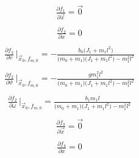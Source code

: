 \documentclass[11pt,a4paper,oneside]{book}
\numberwithin{equation}{section}
\theoremstyle{it}
\theoremstyle{definition}
\begin{document}
\begin{equation}\label{pendulum_on_cart_14}
	\begin{aligned}
		\frac{\partial f_1}{\partial \vec{x}}=\vec{0}\\[6pt]
	\end{aligned}
\end{equation}
\begin{equation}\label{pendulum_on_cart_15}
	\begin{aligned}
		\frac{\partial f_2}{\partial x}=0\\[6pt]
	\end{aligned}
\end{equation}
\begin{equation}\label{pendulum_on_cart_16}
	\begin{aligned}
		\frac{\partial f_2}{\partial v}\,\Big|_{\vec{x}_0,f_{m,0}}=-\frac{b_0\big(J_1+m_1l^2\big)}{\big(m_0+m_1\big)\big(J_1+m_1l^2\big)-m_1^2l^2}\\[6pt]
	\end{aligned}
\end{equation}
\begin{equation}\label{pendulum_on_cart_17}
	\begin{aligned}
		\frac{\partial f_2}{\partial \vartheta}\,\Big|_{\vec{x}_0,f_{m,0}}=-\frac{gm_1^2l^2}{\big(m_0+m_1\big)\big(J_1+m_1l^2\big)-m_1^2l^2}\\[6pt]
	\end{aligned}
\end{equation}
\begin{equation}\label{pendulum_on_cart_18}
	\begin{aligned}
		\frac{\partial f_2}{\partial \omega}\,\Big|_{\vec{x}_0,f_{m,0}}=\frac{b_1m_1l}{\big(m_0+m_1\big)\big(J_1+m_1l^2\big)-m_1^2l^2}\\[6pt]
	\end{aligned}
\end{equation}
\begin{equation}\label{pendulum_on_cart_19}
	\begin{aligned}
		\frac{\partial f_3}{\partial \vec{x}}=\vec{0}\\[6pt]
	\end{aligned}
\end{equation}
\begin{equation}\label{pendulum_on_cart_20}
	\begin{aligned}
		\frac{\partial f_4}{\partial x}=0\\[6pt]
	\end{aligned}
\end{equation}
\end{document}
